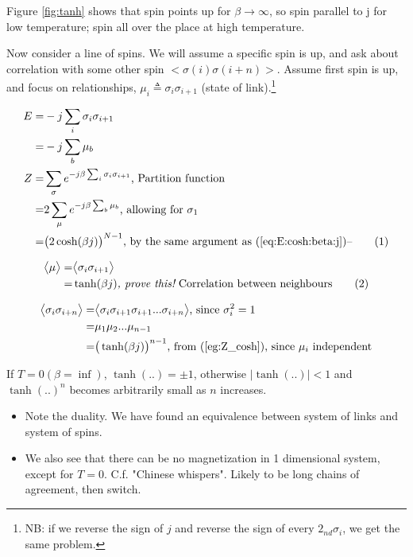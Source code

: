\documentclass[]{article}
\newcommand\numberthis{\addtocounter{equation}{1}\tag{\theequation}}
\begin{document}
Figure \ref{fig:tanh} shows that spin points up for $\beta\rightarrow\infty$, so spin parallel to j for low temperature; spin all over the place at high temperature.

Now consider a line of spins. We will assume a specific spin is up, and ask about correlation with some other spin $\big<\sigma(i) \sigma(i+n)\big>$. Assume first spin is up, and focus on relationships, $\mu_i\triangleq\sigma_i\sigma_{i+1}$ (state of link).\footnote{NB: if we reverse the sign of $j$ and reverse the sign of every $2_{nd} \sigma_i$, we get the same problem. }

\begin{align*}
E =& -j \sum_i \sigma_i \sigma_{i+1}\\
=& -j \sum_{b} \mu_b\\
Z =& \sum_{\sigma} e^{- j \beta\sum_i  \sigma_i \sigma_{i+1}} \text{, Partition function}\\
=& 2 \sum_{\mu} e^{- j \beta  \sum_b \mu_b} \text{, allowing for $\sigma_1$}\\
=& \big(2 \cosh(\beta j)\big)^{N-1}\text{, by the same argument as (\ref{eq:E:cosh:beta:j})--}\numberthis \label{eq:Z:cosh} 
\end{align*}

\begin{align*}
\big< \mu \big> =& \big< \sigma_i \sigma_{i+1} \big>\\
=& \tanh(\beta j) \textit{, prove this!}\text{ Correlation between neighbours}\numberthis \label{eg:Z_cosh}
\end{align*}

\begin{align*}
\big < \sigma_i \sigma_{i+n} \big> =&  \big < \sigma_i \sigma_{i+1} \sigma_{i+1}... \sigma_{i+n} \big>\text{, since $\sigma_i^2 = 1$}\\
=& \mu_1 \mu_2 ... \mu_{n-1}\\
=& \big( \tanh(\beta j)\big)^{n-1}\text{, from (\ref{eg:Z_cosh}), since $\mu_i$ independent}
\end{align*}

If $T=0(\beta=\inf)$, $\tanh(..)=\pm1$, otherwise $\lvert \tanh(..) \rvert<1$ and $\tanh(..)^n$ becomes arbitrarily small as $n$ increases.

\begin{itemize}
	\item Note the duality. We have found an equivalence between system of links and system of spins. 
	\item We also see that there can be no magnetization in 1 dimensional system, except for $T=0$. C.f. "Chinese whispers". Likely to be long chains of agreement, then switch.
\end{itemize}
 
\end{document}
